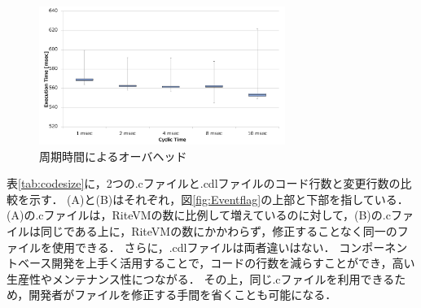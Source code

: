 \documentclass[submit,techrep]{ipsj}
\begin{document}

\begin{figure}[t]
    \centering
    \includegraphics[width=8cm,clip]{../EMSOFT2016/figure/comparison_msec.pdf}
    \caption{周期時間によるオーバヘッド}
    \label{fig:comparison_msec}
\end{figure}

表\ref{tab:codesize}に，2つの.cファイルと.cdlファイルのコード行数と変更行数の比較を示す．
(A)と(B)はそれぞれ，図\ref{fig:Eventflag}の上部と下部を指している．
(A)の.cファイルは，RiteVMの数に比例して増えているのに対して，(B)の.cファイルは同じである上に，RiteVMの数にかかわらず，修正することなく同一のファイルを使用できる．
さらに，.cdlファイルは両者違いはない．
コンポーネントベース開発を上手く活用することで，コードの行数を減らすことができ，高い生産性やメンテナンス性につながる．
その上，同じ.cファイルを利用できるため，開発者がファイルを修正する手間を省くことも可能になる．

\end{document}
